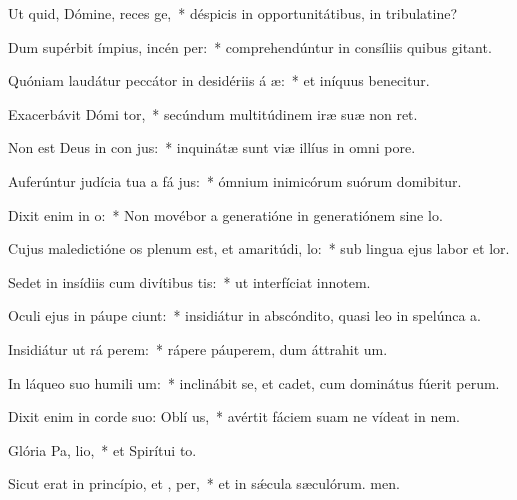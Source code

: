 \item Ut quid, Dómine, reces ge,~* déspicis in opportunitátibus, in tribulatine?
\item Dum supérbit ímpius, incén per:~* comprehendúntur in consíliis quibus gitant.
\item Quóniam laudátur peccátor in desidériis á æ:~* et iníquus benecitur.
\item Exacerbávit Dómi tor,~* secúndum multitúdinem iræ suæ non ret.
\item Non est Deus in con jus:~* inquinátæ sunt viæ illíus in omni pore.
\item Auferúntur judícia tua a fá jus:~* ómnium inimicórum suórum domibitur.
\item Dixit enim in  o:~* Non movébor a generatióne in generatiónem sine lo.
\item Cujus maledictióne os plenum est, et amaritúdi,  lo:~* sub lingua ejus labor et lor.
\item Sedet in insídiis cum divítibus  tis:~* ut interfíciat innotem.
\item Oculi ejus in páupe ciunt:~* insidiátur in abscóndito, quasi leo in spelúnca a.
\item Insidiátur ut rá perem:~* rápere páuperem, dum áttrahit um.
\item In láqueo suo humili um:~* inclinábit se, et cadet, cum dominátus fúerit perum.
\item Dixit enim in corde suo: Oblí  us,~* avértit fáciem suam ne vídeat in nem.
\item Glória Pa,  lio,~* et Spirítui to.
\item Sicut erat in princípio, et ,  per,~* et in sǽcula sæculórum. men.
